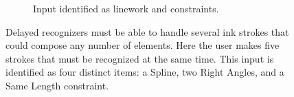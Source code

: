 \begin{figure}
\begin{subfigure}[t]{0.26\textwidth}
    \caption{Input identified as linework and constraints.}
    \label{fig:delayed-example-3}
  \end{subfigure}
  \caption[Delayed Recognizer Example]{Delayed recognizers must be
    able to handle several ink strokes that could compose any number
    of elements. Here the user makes five strokes that must be
    recognized at the same time. This input is identified as four
    distinct items: a Spline, two Right Angles, and a Same Length
    constraint. }
  \label{fig:fig-delayed-example}
\end{figure}
